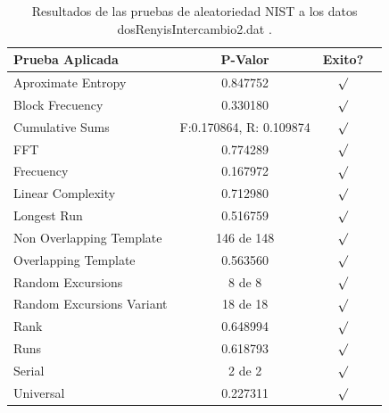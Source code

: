 \documentclass[10pt]{IEEEtran}
\begin{document}
 
 

\begin{table}[H]
\caption{Resultados de las pruebas de aleatoriedad NIST a los datos dosRenyisIntercambio2.dat .}
\label{sample-table}
\vskip 0.15in
\begin{center}
\begin{small}
\begin{sc}
\begin{tabular}{lccr}
\hline

Prueba Aplicada &  P-Valor & Exito? \\
\hline

Aproximate Entropy    &   0.847752 & $\surd$ \\

Block Frecuency  & 0.330180  &  $\surd$  \\

Cumulative Sums    &   F:0.170864, R: 0.109874  & $\surd$ \\

FFT    &   0.774289 &   $\surd$      \\

Frecuency     &  0.167972 &  $\surd$   \\

Linear Complexity      & 0.712980 & $\surd$ \\

Longest Run      &  0.516759 &    $\surd$      \\

Non Overlapping Template      & 146 de 148    &     $\surd$          \\

Overlapping Template      &  0.563560  &        $\surd$       \\

Random Excursions      & 8 de 8  &    $\surd$      \\

Random Excursions Variant & 18 de 18 &     $\surd$    \\

Rank &   0.648994  &      $\surd$      \\

Runs &   0.618793 &     $\surd$        \\

Serial &     2 de 2    &     $\surd$        \\

Universal &       0.227311&   $\surd$            \\

\hline



\end{tabular}
\end{sc}
\end{small}
\end{center}
\vskip -0.1in
\end{table}
\end{document}
